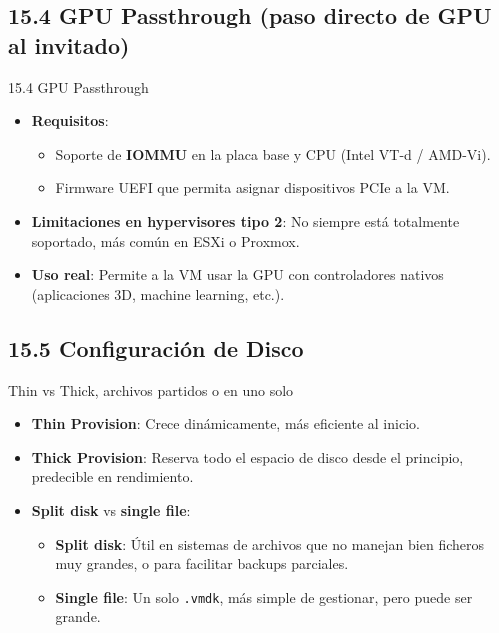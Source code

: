 \documentclass{beamer}
\begin{document}
\subsection{15.4 GPU Passthrough (paso directo de GPU al invitado)}
\begin{frame}{15.4 GPU Passthrough}
    \begin{itemize}
        \item \textbf{Requisitos}:
            \begin{itemize}
                \item Soporte de \textbf{IOMMU} en la placa base y CPU (Intel VT-d / AMD-Vi).
                \item Firmware UEFI que permita asignar dispositivos PCIe a la VM.
            \end{itemize}
        \item \textbf{Limitaciones en hypervisores tipo 2}: No siempre está totalmente soportado, más común en ESXi o Proxmox.
        \item \textbf{Uso real}: Permite a la VM usar la GPU con controladores nativos (aplicaciones 3D, machine learning, etc.).
    \end{itemize}
\end{frame}

\subsection{15.5 Configuración de Disco}
\begin{frame}{Thin vs Thick, archivos partidos o en uno solo}
    \begin{itemize}
        \item \textbf{Thin Provision}: Crece dinámicamente, más eficiente al inicio.
        \item \textbf{Thick Provision}: Reserva todo el espacio de disco desde el principio, predecible en rendimiento.
        \item \textbf{Split disk} vs \textbf{single file}:
            \begin{itemize}
                \item \textbf{Split disk}: Útil en sistemas de archivos que no manejan bien ficheros muy grandes, o para facilitar backups parciales.
                \item \textbf{Single file}: Un solo \texttt{.vmdk}, más simple de gestionar, pero puede ser grande.
            \end{itemize}
    \end{itemize}
\end{frame}
\end{document}
